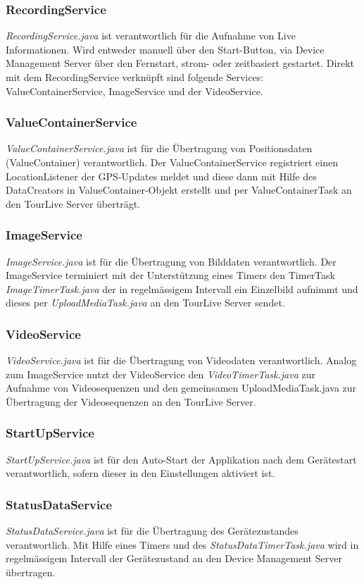 \subsubsection{RecordingService} 
\textit{RecordingService.java} ist verantwortlich für die Aufnahme von Live Informationen. Wird entweder manuell über den Start-Button, via Device Management Server über den Fernstart, strom- oder zeitbasiert gestartet. Direkt mit dem RecordingService verknüpft sind folgende Services: ValueContainerService, ImageService und der VideoService.
\subsubsection{ValueContainerService} 
\textit{ValueContainerService.java} ist für die Übertragung von Positionsdaten (ValueContainer) verantwortlich. Der ValueContainerService registriert einen LocationListener der GPS-Updates meldet und diese dann mit Hilfe des DataCreators in ValueContainer-Objekt erstellt und per ValueContainerTask an den TourLive Server überträgt.
\subsubsection{ImageService} 
\textit{ImageService.java} ist für die Übertragung von Bilddaten verantwortlich. Der ImageService terminiert mit der Unterstützung eines Timers den TimerTask \textit{ImageTimerTask.java} der in regelmässigem Intervall ein Einzelbild aufnimmt und dieses per \textit{UploadMediaTask.java} an den TourLive Server sendet. 
\subsubsection{VideoService} 
\textit{VideoService.java} ist für die  Übertragung von Videodaten verantwortlich. Analog zum ImageService nutzt der VideoService den \textit{VideoTimerTask.java} zur Aufnahme von Videosequenzen und den gemeinsamen UploadMediaTask.java zur Übertragung der Videosequenzen an den TourLive Server.
\subsubsection{StartUpService} 
\textit{StartUpService.java} ist für den Auto-Start der Applikation nach dem Gerätestart verantwortlich, sofern dieser in den Einstellungen aktiviert ist. \cite{androidservice2011}
\subsubsection{StatusDataService} 
\textit{StatusDataService.java} ist für die  Übertragung des Gerätezustandes verantwortlich. Mit Hilfe eines Timers und des \textit{StatusDataTimerTask.java} wird in regelmässigem Intervall der Gerätezustand an den Device Management Server übertragen.

